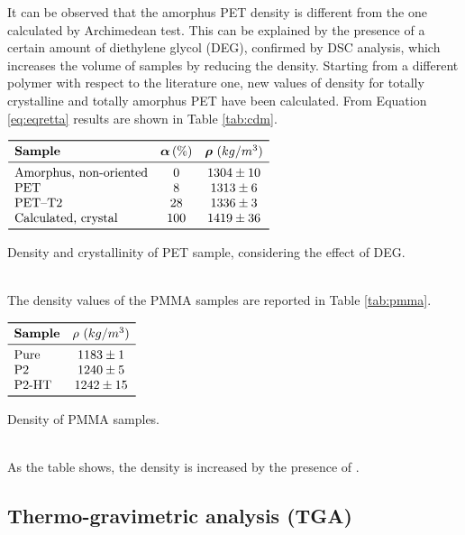 \documentclass[a4paper, 11pt]{article}
\begin{document}
It can be observed that the amorphus PET density is different from the one calculated by Archimedean test. This can be explained by the presence of a certain amount of diethylene glycol (DEG), confirmed by DSC analysis, which increases the volume of samples by reducing the density. Starting from a different polymer with respect to the literature one, new values of density for totally crystalline and totally amorphus PET have been calculated. From Equation \ref{eq:eqretta} results are shown in Table \ref{tab:cdm}.
\begin{table}[htp]
\centering
$
\begin{array}{lcc}
\toprule
\textbf{Sample} & \boldsymbol{\alpha}\,(\%) & \boldsymbol{\rho}\,\,({kg/m^{3}})\\
\midrule
\text{Amorphus, non-oriented} & 0 & 1304 \pm 10\\
\text{PET} & 8 & 1313 \pm 6\\
\text{PET–T2} & 28 & 1336 \pm 3\\
\text{Calculated, crystal} & 100 & 1419 \pm 36\\
\bottomrule
\end{array}
$
\caption{Density and crystallinity of PET sample, considering the effect of DEG.}
\label{tab:cdm}
\end{table}\\
\newpage
The density values of the PMMA samples are reported in Table \ref{tab:pmma}.
\begin{table}[htp]
\centering
$
\begin{array}{lc}
\toprule
\textbf{Sample} & \mathbf{\rho}\,\,({kg/m^{3}})\\
\midrule
\text{Pure} & 1183 \pm 1\\
\text{P2} & 1240 \pm 5\\
\text{P2-HT} & 1242 \pm 15\\
\bottomrule
\end{array}
$
\caption{Density of PMMA samples.}
\label{tab:pmma}
\end{table}\\
As the table shows, the density is increased by the presence of .

\subsection{Thermo-gravimetric analysis (TGA)}
\end{document}
